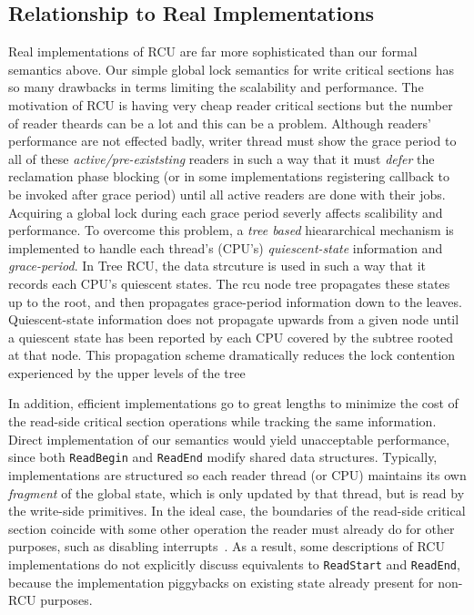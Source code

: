 \subsection{Relationship to Real Implementations}
Real implementations of RCU are far more sophisticated than our formal semantics above. Our simple global lock semantics for write critical sections has so many drawbacks in terms limiting the scalability and performance. The motivation of \textsf{RCU} is having very cheap reader critical sections but the number of reader theards can be a lot and this can be a problem. Although readers' performance are not effected badly, writer thread must show the grace period to all of these \emph{active/pre-existsting} readers in such a way that it must \emph{defer} the reclamation phase blocking (or in some implementations registering callback to be invoked after grace period) until all active readers are done with their jobs. Acquiring a global lock during each grace period severly affects scalibility and performance. To overcome this problem, a \emph{tree based} hieararchical mechanism is implemented to handle each thread's (CPU's) \emph{quiescent-state} information and \emph{grace-period}. In Tree RCU, the data strcuture is used in such a way that it records each CPU's quiescent states. The \textsf{rcu} node tree propagates these states up to the root, and then propagates grace-period information down to the leaves. Quiescent-state information does not propagate upwards from a given node until a quiescent state has been reported by each CPU covered by the subtree rooted at that node. This propagation scheme dramatically reduces the lock contention experienced by the upper levels of the tree ~\cite{LiangMKM16}
  
In addition, efficient implementations go to great lengths to minimize the cost of the read-side critical section operations while tracking the same information.  Direct implementation of our semantics would yield unacceptable performance, since both \lstinline|ReadBegin| and \lstinline|ReadEnd| modify shared data structures.  Typically, implementations are structured so each reader thread (or CPU) maintains its own \emph{fragment} of the global state, which is only updated by that thread, but is read by the write-side primitives.
In the ideal case, the boundaries of the read-side critical section coincide with some other operation the reader must already do for other purposes, such as disabling interrupts~\tocite{}. As a result, some descriptions of RCU implementations do not explicitly discuss equivalents to \lstinline|ReadStart| and \lstinline|ReadEnd|, because the implementation piggybacks on existing state already present for non-RCU purposes.

